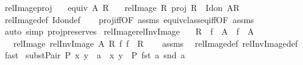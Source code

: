 \begin{isabellebody}
\ relImage{\isacharunderscore}{\kern0pt}proj{\isacharcolon}{\kern0pt}\isanewline
\ \ \ {\isachardoublequoteopen}equiv\ A\ R{\isachardoublequoteclose}\isanewline
\ \ \ {\isachardoublequoteopen}relImage\ R\ {\isacharparenleft}{\kern0pt}proj\ R{\isacharparenright}{\kern0pt}\ {\isasymsubseteq}\ Id{\isacharunderscore}{\kern0pt}on\ {\isacharparenleft}{\kern0pt}A{\isacharslash}{\kern0pt}{\isacharslash}{\kern0pt}R{\isacharparenright}{\kern0pt}{\isachardoublequoteclose}\isanewline
%
\isadelimproof
\ \ %
\endisadelimproof
%
\isatagproof
{}\isamarkupfalse%
\ relImage{\isacharunderscore}{\kern0pt}def\ Id{\isacharunderscore}{\kern0pt}on{\isacharunderscore}{\kern0pt}def\isanewline
\ \ \isamarkupfalse%
\ proj{\isacharunderscore}{\kern0pt}iff{\isacharbrackleft}{\kern0pt}OF\ assms{\isacharbrackright}{\kern0pt}\ equiv{\isacharunderscore}{\kern0pt}class{\isacharunderscore}{\kern0pt}eq{\isacharunderscore}{\kern0pt}iff{\isacharbrackleft}{\kern0pt}OF\ assms{\isacharbrackright}{\kern0pt}\isanewline
\ \ \isamarkupfalse%
\ {\isacharparenleft}{\kern0pt}auto\ simp{\isacharcolon}{\kern0pt}\ proj{\isacharunderscore}{\kern0pt}preserves{\isacharparenright}{\kern0pt}%
\endisatagproof
{\isafoldproof}%
%
\isadelimproof
\isanewline
%
\endisadelimproof
\isanewline
{}\isamarkupfalse%
\ relImage{\isacharunderscore}{\kern0pt}relInvImage{\isacharcolon}{\kern0pt}\isanewline
\ \ \ {\isachardoublequoteopen}R\ {\isasymsubseteq}\ f\ {\isacharbackquote}{\kern0pt}\ A\ {\isasymtimes}\ f\ {\isacharbackquote}{\kern0pt}\ A{\isachardoublequoteclose}\isanewline
\ \ \ {\isachardoublequoteopen}relImage\ {\isacharparenleft}{\kern0pt}relInvImage\ A\ R\ f{\isacharparenright}{\kern0pt}\ f\ {\isacharequal}{\kern0pt}\ R{\isachardoublequoteclose}\isanewline
%
\isadelimproof
\ \ %
\endisadelimproof
%
\isatagproof
{}\isamarkupfalse%
\ assms\ \isamarkupfalse%
\ relImage{\isacharunderscore}{\kern0pt}def\ relInvImage{\isacharunderscore}{\kern0pt}def\ \isamarkupfalse%
\ fast%
\endisatagproof
{\isafoldproof}%
%
\isadelimproof
\isanewline
%
\endisadelimproof
\isanewline
{}\isamarkupfalse%
\ subst{\isacharunderscore}{\kern0pt}Pair{\isacharcolon}{\kern0pt}\ {\isachardoublequoteopen}P\ x\ y\ {\isasymLongrightarrow}\ a\ {\isacharequal}{\kern0pt}\ {\isacharparenleft}{\kern0pt}x{\isacharcomma}{\kern0pt}\ y{\isacharparenright}{\kern0pt}\ {\isasymLongrightarrow}\ P\ {\isacharparenleft}{\kern0pt}fst\ a{\isacharparenright}{\kern0pt}\ {\isacharparenleft}{\kern0pt}snd\ a{\isacharparenright}{\kern0pt}{\isachardoublequoteclose}\isanewline

\end{isabellebody}
